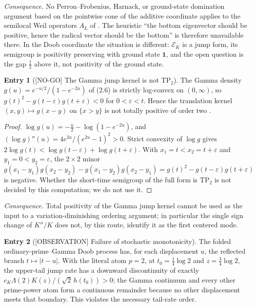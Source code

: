 \documentclass[11pt]{amsart}
\theoremstyle{definition}
\newcounter{family}
\newtheorem{entry}{Entry}[family]
\theoremstyle{remark}
\newcommand{\eps}{\varepsilon}
\newcommand{\EK}{\mathscr E_K}
\newcommand{\NOGO}{\textup{[NO-GO]}}
\newcommand{\OBS}{\textup{[OBSERVATION]}}
\begin{document}
\emph{Consequence.} No Perron--Frobenius, Harnack, or ground-state
domination argument based on the pointwise cone of the additive
coordinate applies to the semilocal Weil operators \(A_L\) of
\cite{TrejoPizzo39}.  The heuristic ``the bottom eigenvector should be
positive, hence the radical vector should be the bottom'' is therefore
unavailable there.  In the Doob coordinate the situation is different:
\(\EK\) is a jump form, its semigroup is positivity preserving with
ground state \(\mathbf 1\), and the open question is the gap \(\tfrac12\)
above it, not positivity of the ground state.

\begin{entry}[\NOGO{} The Gamma jump kernel is not \(\mathrm{TP}_2\)]
\label{ent:A2}
The Gamma density \(g(u)=e^{-u/2}/(1-e^{-2u})\) of (2.6) is strictly
log-convex on \((0,\infty)\), so \(g(t)^2-g(t-\eps)g(t+\eps)<0\) for
\(0<\eps<t\).  Hence the translation kernel \((x,y)\mapsto g(x-y)\) on
\(\{x>y\}\) is not totally positive of order two \cite{Karlin}.
\end{entry}

\begin{proof}
\(\log g(u)=-\frac u2-\log(1-e^{-2u})\), and
\((\log g)''(u)=4e^{2u}/(e^{2u}-1)^2>0\).  Strict convexity of \(\log g\)
gives \(2\log g(t)<\log g(t-\eps)+\log g(t+\eps)\).  With
\(x_1=t<x_2=t+\eps\) and \(y_1=0<y_2=\eps\), the \(2\times2\) minor
\(g(x_1-y_1)g(x_2-y_2)-g(x_1-y_2)g(x_2-y_1)=g(t)^2-g(t-\eps)g(t+\eps)\)
is negative.  Whether the short-time semigroup of the full form is
\(\mathrm{TP}_2\) is not decided by this computation; we do not use it.
\end{proof}

\emph{Consequence.} Total positivity of the Gamma jump kernel cannot be
used as the input to a variation-diminishing ordering argument; in
particular the single sign change of \(K''/K\) does not, by this route,
identify it as the first centered mode.

\begin{entry}[\OBS{} Failure of stochastic monotonicity]
\label{ent:A3}
The folded ordinary-prime--Gamma Doob process has, for each displacement
\(u\), the reflected branch \(t\mapsto|t-u|\).  With the literal atom
\(p=2\), at \(t_0=\frac14\log2\) and \(z=\frac34\log2\), the upper-tail
jump rate has a downward discontinuity of exactly
\(c_K\Lambda(2)K(z)/(\sqrt2\,h(t_0))>0\); the Gamma continuum and every
other prime-power atom form a continuous remainder because no other
displacement meets that boundary.  This violates the necessary tail-rate
order.
\end{entry}
\end{document}
